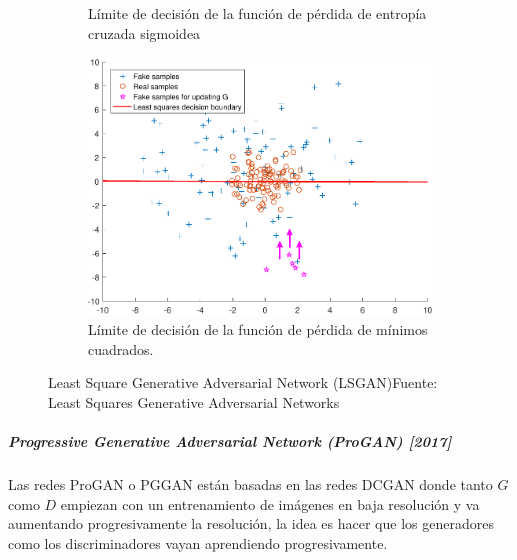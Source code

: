 \begin{figure}[H]
\begin{subfigure}{.30\linewidth}
        \caption{Límite de decisión de la función de pérdida de entropía cruzada sigmoidea}
        \label{subfig:LSGAN-2}
    \end{subfigure}
    \vspace{0.03\linewidth}
    \begin{subfigure}{.30\linewidth}
        \centering
        \includegraphics[width=0.95\linewidth]{figures/chapter02/boundary_3.pdf}
        \caption{Límite de decisión de la función de pérdida de mínimos cuadrados.}
        \label{subfig:LSGAN-3}
    \end{subfigure}

    \caption{Least Square Generative Adversarial Network (LSGAN)\newline{}Fuente: Least Squares Generative Adversarial Networks \cite{LSGAN-mao2017squares}}
    \label{fig:LSGAN}
\end{figure}



\subparagraph{Progressive Generative Adversarial Network (ProGAN) [2017]}

Las redes \gls{ProGAN} o \gls{PGGAN} \cite{ProGAN-karras2018progressive} están basadas en las redes \gls{DCGAN} donde tanto ${G}$ como ${D}$ empiezan con un entrenamiento de imágenes en baja resolución y va aumentando progresivamente la resolución, la idea es hacer que los generadores como los discriminadores vayan aprendiendo progresivamente.


